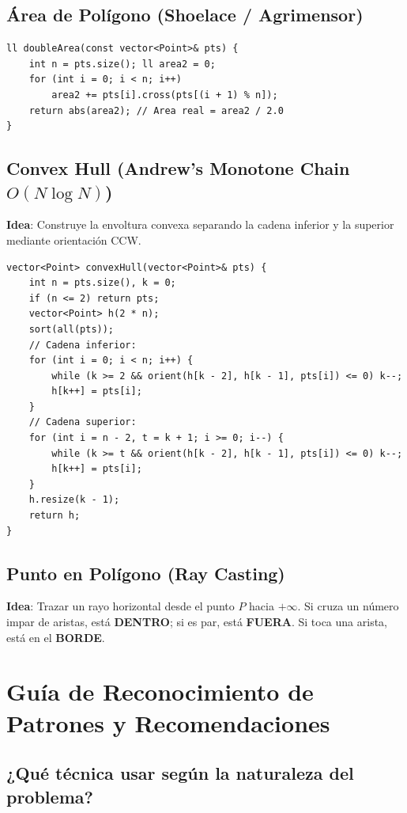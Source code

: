 \documentclass[9pt,twocolumn,a4paper]{extarticle}
\begin{document}
\subsection{Área de Polígono (Shoelace / Agrimensor)}
\begin{lstlisting}
ll doubleArea(const vector<Point>& pts) {
    int n = pts.size(); ll area2 = 0;
    for (int i = 0; i < n; i++)
        area2 += pts[i].cross(pts[(i + 1) % n]);
    return abs(area2); // Area real = area2 / 2.0
}
\end{lstlisting}

\subsection{Convex Hull (Andrew's Monotone Chain $O(N \log N)$)}
\textbf{Idea}: Construye la envoltura convexa separando la cadena inferior y la superior mediante orientación CCW.
\begin{lstlisting}
vector<Point> convexHull(vector<Point>& pts) {
    int n = pts.size(), k = 0;
    if (n <= 2) return pts;
    vector<Point> h(2 * n);
    sort(all(pts));
    // Cadena inferior:
    for (int i = 0; i < n; i++) {
        while (k >= 2 && orient(h[k - 2], h[k - 1], pts[i]) <= 0) k--;
        h[k++] = pts[i];
    }
    // Cadena superior:
    for (int i = n - 2, t = k + 1; i >= 0; i--) {
        while (k >= t && orient(h[k - 2], h[k - 1], pts[i]) <= 0) k--;
        h[k++] = pts[i];
    }
    h.resize(k - 1);
    return h;
}
\end{lstlisting}

\subsection{Punto en Polígono (Ray Casting)}
\textbf{Idea}: Trazar un rayo horizontal desde el punto $P$ hacia $+\infty$. Si cruza un número impar de aristas, está \textbf{DENTRO}; si es par, está \textbf{FUERA}. Si toca una arista, está en el \textbf{BORDE}.

\section{Guía de Reconocimiento de Patrones y Recomendaciones}
\subsection{¿Qué técnica usar según la naturaleza del problema?}
\end{document}
